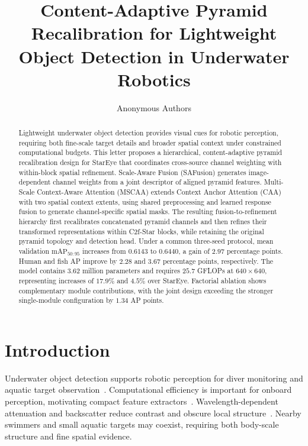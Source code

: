 \documentclass[letterpaper,10pt,conference]{ieeeconf}
\title{\LARGE\bfseries
Content-Adaptive Pyramid Recalibration for Lightweight
Object Detection in Underwater Robotics}
\author{Anonymous Authors}
\begin{document}
\maketitle
\thispagestyle{empty}
\pagestyle{empty}

\begin{abstract}
Lightweight underwater object detection provides visual cues for robotic perception, requiring both fine-scale target details and broader spatial context under constrained computational budgets. This letter proposes a hierarchical, content-adaptive pyramid recalibration design for StarEye that coordinates cross-source channel weighting with within-block spatial refinement. Scale-Aware Fusion (SAFusion) generates image-dependent channel weights from a joint descriptor of aligned pyramid features. Multi-Scale Context-Aware Attention (MSCAA) extends Context Anchor Attention (CAA) with two spatial context extents, using shared preprocessing and learned response fusion to generate channel-specific spatial masks. The resulting fusion-to-refinement hierarchy first recalibrates concatenated pyramid channels and then refines their transformed representations within C2f-Star blocks, while retaining the original pyramid topology and detection head. Under a common three-seed protocol, mean validation \(\mathrm{mAP}_{50:95}\) increases from \(0.6143\) to \(0.6440\), a gain of \(2.97\) percentage points. Human and fish AP improve by \(2.28\) and \(3.67\) percentage points, respectively. The model contains \(3.62\) million parameters and requires \(25.7\) GFLOPs at \(640\times640\), representing increases of \(17.9\%\) and \(4.5\%\) over StarEye. Factorial ablation shows complementary module contributions, with the joint design exceeding the stronger single-module configuration by \(1.34\) AP points.

\end{abstract}


\section{Introduction}
Underwater object detection supports robotic perception
for diver monitoring and aquatic target observation~\cite{ref_duo,ref_vddc}.
Computational efficiency is important for onboard perception,
motivating compact feature extractors~\cite{ref_mobilenetv2,ref_ghostnet}.
Wavelength-dependent attenuation and backscatter reduce contrast and
obscure local structure~\cite{ref_jaffe,ref_seathru}.
Nearby swimmers and small aquatic targets may coexist, requiring both
body-scale structure and fine spatial evidence.
\end{document}
